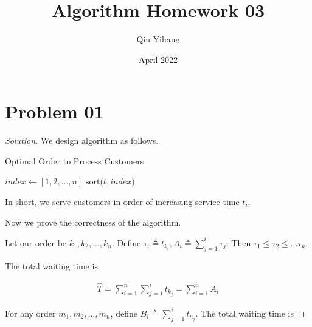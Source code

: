 \documentclass{article}
\title{\textbf{Algorithm Homework 03}}
\author{Qiu Yihang}
\date{April 2022}
\newenvironment{solution}{\begin{proof}[\noindent\it Solution]}{\end{proof}}
\begin{document}
\maketitle

\section{Problem 01}

\vspace{1em}
\begin{solution}
    We design algorithm as follows.
    
    \vspace{-0.5em}
    \begin{algorithm}
        \caption{Optimal Order to Process Customers}
        
	    {
	        $index\gets [1,2,...,n]$\;
	        sort($t,index$)\; 
	   }
    \end{algorithm}
    
    \vspace{-1em} \hspace{3em}
    In short, we serve customers in order of increasing service time $t_i$.
    
    \vspace{1em}\hspace{0.5em}
    Now we prove the correctness of the algorithm. 
    
    \hspace{3em}
    Let our order be $k_1, k_2, ..., k_n$. Define $\tau_i\triangleq t_{k_i}, A_i\triangleq\sum_{j=1}^{i}\tau_j.$ Then $\tau_1\le\tau_2\le...\tau_n.$ 
    
    \hspace{3em}
    The total waiting time is
    
    \vspace{-2.5em}
    \begin{align*}
        \hat{T} = \sum_{i=1}^{n}\sum_{j=1}^{i} t_{k_j} = \sum_{i=1}^{n} A_i
    \end{align*}
    
    \vspace{-1em} \hspace{3em}
    For any order $m_1, m_2, ... , m_n$, define $B_i\triangleq\sum_{j=1}^{i}t_{n_j}.$ The total waiting time is 
    

\end{solution}
\end{document}
